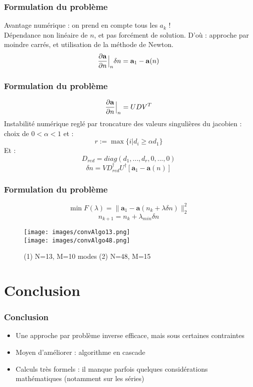 \documentclass[handout]{beamer}
\def\restriction#1#2{\mathchoice
              {\setbox1\hbox{${\displaystyle #1}_{\scriptstyle #2}$}
              \restrictionaux{#1}{#2}}
              {\setbox1\hbox{${\textstyle #1}_{\scriptstyle #2}$}
              \restrictionaux{#1}{#2}}
              {\setbox1\hbox{${\scriptstyle #1}_{\scriptscriptstyle #2}$}
              \restrictionaux{#1}{#2}}
              {\setbox1\hbox{${\scriptscriptstyle #1}_{\scriptscriptstyle #2}$}
              \restrictionaux{#1}{#2}}}
\def\restrictionaux#1#2{{#1\,\smash{\vrule height .8\ht1 depth .85\dp1}}_{\,#2}}
\begin{document}
\begin{frame}
	\frametitle{Formulation du problème}
Avantage numérique : on prend en compte tous les $a_k$ !\\
Dépendance non linéaire de $n$, et pas forcément de solution. D'où : approche par moindre carrés, et utilisation de la méthode de Newton.
\begin{equation}\label{eq24}
	\restriction{\frac{\partial\mathbf{a}}{\partial n}}{n}\delta n=\mathbf{a}_1-\mathbf{a}(n)
\end{equation}
\end{frame}

\begin{frame}
	\frametitle{Formulation du problème}
	\[\restriction{\frac{\partial\mathbf{a}}{\partial n}}{n}=UDV^T\]
Instabilité numérique reglé par troncature des valeurs singulières du jacobien : choix de $0<\alpha<1$ et :
	\[r:=\max\{i | d_i\geq \alpha d_1\}\]
Et :
	\[D_{red}=diag(d_1,...,d_r,0,...,0)\]
\begin{equation}\label{eq26}
	\delta n=VD_{red}^\dagger U^\dagger [\mathbf{a}_1-\mathbf{a}(n)]
\end{equation}
\end{frame}

\begin{frame}
	\frametitle{Formulation du problème}
	\[\min F(\lambda)=\|\mathbf{a}_1-\mathbf{a}(n_k+\lambda\delta n)\|_2^2\]
	\[n_{k+1}=n_k+\lambda_{min}\delta n\]
\begin{figure}[!h]
	\centering
	\texttt{[image: images/convAlgo13.png]}\\
	\texttt{[image: images/convAlgo48.png]}
	\caption{(1) N=13, M=10 modes (2) N=48, M=15}
	\label{fig:accConv}
\end{figure}
\end{frame}

\section*{Conclusion}
\begin{frame}
	\frametitle{Conclusion}
\begin{itemize}
	\item Une approche par problème inverse efficace, mais sous certaines contraintes
	\item Moyen d'améliorer : algorithme en cascade
	\item Calculs très formels : il manque parfois quelques considérations mathématiques (notamment sur les séries)
\end{itemize}
\end{frame}
\end{document}
